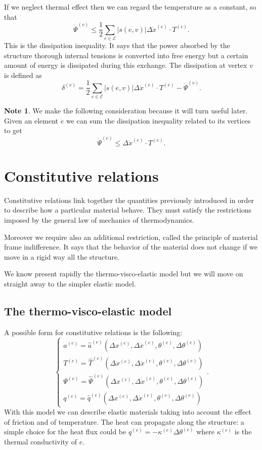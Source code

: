 \documentclass[a4paper,11pt]{article}
\theoremstyle{definition}
\newtheorem*{note}{Note}
\begin{document}
If we neglect thermal effect then we can regard the temperature as a constant, so that
\[
\dot{\Psi}^{(v)}\le\frac{1}{2}\sum_{e\in\mathscr{E}}|s(e,v)|\Delta \dot{x}^{(e)}\cdot T^{(e)}.
\]
This is the dissipation inequality. It says that the power absorbed by the structure thorough internal tensions is converted into free energy but a certain amount of energy is dissipated during this exchange. The dissipation at vertex $v$ is defined as
\[
\delta^{(v)}=\frac{1}{2}\sum_{e\in\mathscr{E}}|s(e,v)|\Delta \dot{x}^{(e)}\cdot T^{(e)}-\dot{\Psi}^{(v)}.
\]
\begin{note}
We make the following consideration because it will turn useful later. Given an element $e$ we can sum the dissipation inequality related to its vertices to get
\[
\dot{\Psi}^{(e)}\le\Delta \dot{x}^{(e)}\cdot T^{(e)}.
\]
\end{note}

\section{Constitutive relations}

Constitutive relations link together the quantities previously introduced in order to describe how a particular material behave. They must satisfy the restrictions imposed by the general law of mechanics of thermodynamics.

Moreover we require also an additional restriction, called the principle of material frame indifference. It says that the behavior of the material does not change if we move in a rigid way all the structure.

We know present rapidly the thermo-visco-elastic model but we will move on straight away to the simpler elastic model.

\subsection*{The thermo-visco-elastic model}

A possible form for constitutive relations is the following:
\[
\begin{cases}
a^{(e)}=\hat{a}^{(e)}(\Delta x^{(e)},\Delta\dot{x}^{(e)},\theta^{(e)},\Delta\theta^{(e)}) \\
T^{(e)}=\hat{T}^{(e)}(\Delta x^{(e)},\Delta\dot{x}^{(e)},\theta^{(e)},\Delta\theta^{(e)}) \\
\Psi^{(e)}=\hat{\Psi}^{(e)}(\Delta x^{(e)},\Delta\dot{x}^{(e)},\theta^{(e)},\Delta\theta^{(e)})\\
q^{(e)}=\hat{q}^{(e)}(\Delta x^{(e)},\Delta\dot{x}^{(e)},\theta^{(e)},\Delta\theta^{(e)})
\end{cases}.
\]
With this model we can describe elastic materials taking into account the effect of friction and of temperature. The heat can propagate along the structure: a simple choice for the heat flux could be $q^{(e)}=-\kappa^{(e)}\Delta\theta^{(e)}$ where $\kappa^{(e)}$ is the thermal conductivity of $e$.
\end{document}
